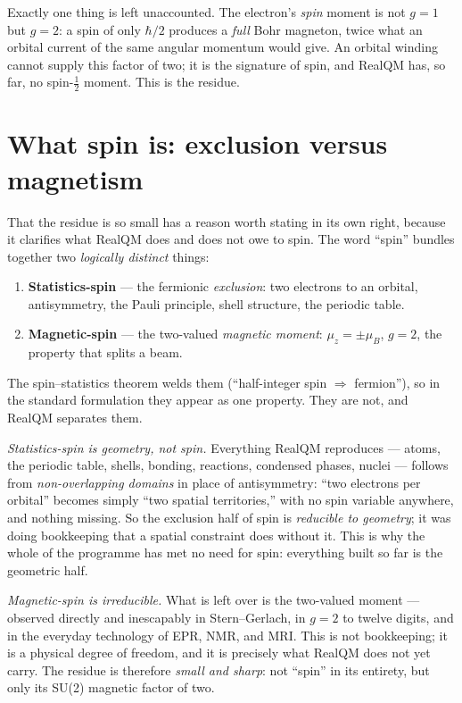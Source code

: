 \documentclass[11pt]{article}
\begin{document}
Exactly one thing is left unaccounted. The electron's \emph{spin} moment is not $g=1$ but
\textbf{$g=2$}: a spin of only $\hbar/2$ produces a \emph{full} Bohr magneton, twice what an orbital
current of the same angular momentum would give. An orbital winding cannot supply this factor of two; it
is the signature of spin, and RealQM has, so far, no spin-$\tfrac12$ moment. This is the residue.

\section{What spin is: exclusion versus magnetism}
\label{sec:twoparts}

That the residue is so small has a reason worth stating in its own right, because it clarifies what RealQM
does and does not owe to spin. The word ``spin'' bundles together two \emph{logically distinct} things:
\begin{enumerate}
\item \textbf{Statistics-spin} --- the fermionic \emph{exclusion}: two electrons to an orbital,
antisymmetry, the Pauli principle, shell structure, the periodic table.
\item \textbf{Magnetic-spin} --- the two-valued \emph{magnetic moment}: $\mu_z=\pm\mu_B$, $g=2$, the
property that splits a beam.
\end{enumerate}
The spin--statistics theorem welds them (``half-integer spin $\Rightarrow$ fermion''), so in the standard
formulation they appear as one property. They are not, and RealQM separates them.

\emph{Statistics-spin is geometry, not spin.} Everything RealQM reproduces --- atoms, the periodic table,
shells, bonding, reactions, condensed phases, nuclei --- follows from \emph{non-overlapping domains} in
place of antisymmetry: ``two electrons per orbital'' becomes simply ``two spatial territories,'' with no
spin variable anywhere, and nothing missing. So the exclusion half of spin is \emph{reducible to
geometry}; it was doing bookkeeping that a spatial constraint does without it. This is why the whole of
the programme has met no need for spin: everything built so far is the geometric half.

\emph{Magnetic-spin is irreducible.} What is left over is the two-valued moment --- observed directly and
inescapably in Stern--Gerlach, in $g=2$ to twelve digits, and in the everyday technology of EPR, NMR, and
MRI. This is not bookkeeping; it is a physical degree of freedom, and it is precisely what RealQM does not
yet carry. The residue is therefore \emph{small and sharp}: not ``spin'' in its entirety, but only its
SU(2) magnetic factor of two.
\end{document}
